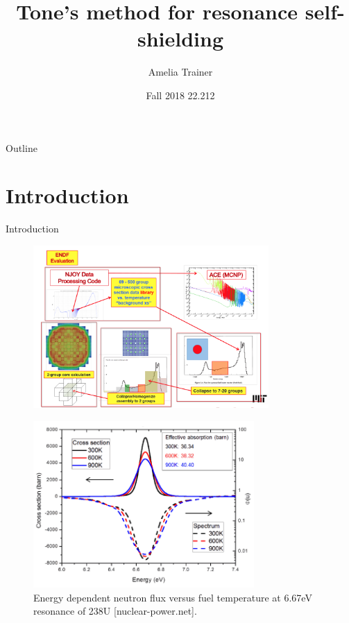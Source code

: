 \documentclass{beamer}
\title[Tone’s method]{Tone’s method for resonance self-shielding}
\author{Amelia Trainer}
\date{Fall 2018 22.212}
\begin{document}
\begin{frame}
  \titlepage
\end{frame}

\begin{frame}{Outline}
  \tableofcontents
\end{frame}

\section{Introduction}

\begin{frame}{Introduction}
\begin{figure}
\includegraphics[width=0.8\textwidth]{f1}
\end{figure}
\end{frame}




\begin{frame}
\begin{figure}
\includegraphics[width=0.75\textwidth]{self-shielding}
  \caption{Energy dependent neutron flux versus fuel temperature at 6.67eV resonance of 238U [nuclear-power.net].}
\end{figure}
\end{frame}
\end{document}
